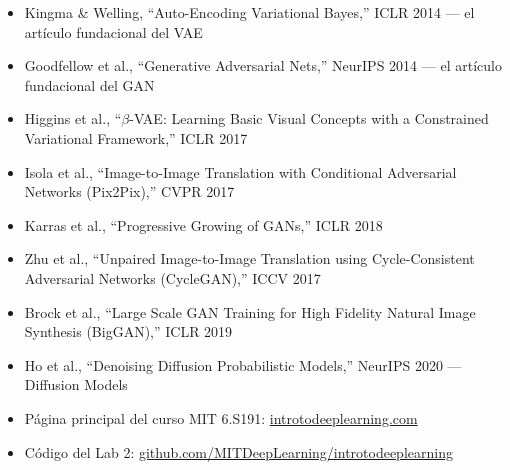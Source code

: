 \begin{itemize}
    \item Kingma \& Welling, ``Auto-Encoding Variational Bayes,'' ICLR 2014 --- el artículo fundacional del VAE
    \item Goodfellow et al., ``Generative Adversarial Nets,'' NeurIPS 2014 --- el artículo fundacional del GAN
    \item Higgins et al., ``$\beta$-VAE: Learning Basic Visual Concepts with a Constrained Variational Framework,'' ICLR 2017
    \item Isola et al., ``Image-to-Image Translation with Conditional Adversarial Networks (Pix2Pix),'' CVPR 2017
    \item Karras et al., ``Progressive Growing of GANs,'' ICLR 2018
    \item Zhu et al., ``Unpaired Image-to-Image Translation using Cycle-Consistent Adversarial Networks (CycleGAN),'' ICCV 2017
    \item Brock et al., ``Large Scale GAN Training for High Fidelity Natural Image Synthesis (BigGAN),'' ICLR 2019
    \item Ho et al., ``Denoising Diffusion Probabilistic Models,'' NeurIPS 2020 --- Diffusion Models
    \item Página principal del curso MIT 6.S191: \href{https://introtodeeplearning.com}{introtodeeplearning.com}
    \item Código del Lab 2: \href{https://github.com/MITDeepLearning/introtodeeplearning}{github.com/MITDeepLearning/introtodeeplearning}
\end{itemize}



